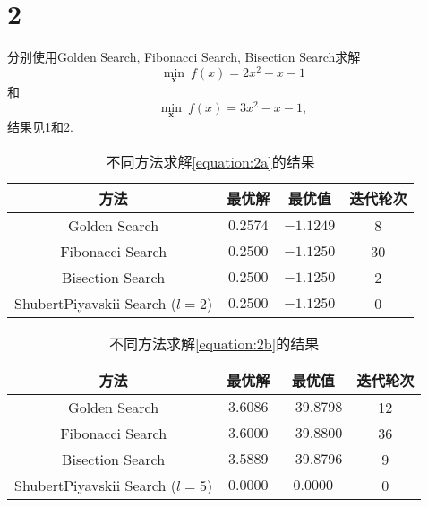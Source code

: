 \section*{2}

分别使用Golden Search, Fibonacci Search, Bisection Search求解
\begin{equation}
    \min_{\bm{x}} ~ f(x)=2x^2-x-1
    \label{equation:2a}
\end{equation}
和
\begin{equation}
    \min_{\bm{x}} ~ f(x)=3x^2-x-1,
    \label{equation:2b}
\end{equation}
结果见\cref{table:2a}和\cref{table:2b}.

\begin{table}[ht]
    \centering
    \caption{不同方法求解\cref{equation:2a}的结果}
    \label{table:2a}
    \begin{tabular}{cccc}
        \toprule
        方法 & 最优解 & 最优值 & 迭代轮次 \\
        \midrule
        Golden Search & $0.2574$ & $-1.1249$ & 8 \\
        Fibonacci Search & $0.2500$ & $-1.1250$ & 30 \\
        Bisection Search & $0.2500$ & $-1.1250$ & 2 \\
        ShubertPiyavskii Search ($l=2$) & $0.2500$ & $-1.1250$ & 0 \\
        \bottomrule
    \end{tabular}
\end{table}


\begin{table}[ht]
    \centering
    \caption{不同方法求解\cref{equation:2b}的结果}
    \label{table:2b}
    \begin{tabular}{cccc}
        \toprule
        方法 & 最优解 & 最优值 & 迭代轮次 \\
        \midrule
        Golden Search & $3.6086$ & $-39.8798$ & 12 \\
        Fibonacci Search & $3.6000$ & $-39.8800$ & 36 \\
        Bisection Search & $3.5889$ & $-39.8796$ & 9 \\
        ShubertPiyavskii Search ($l=5$) & $0.0000$ & $0.0000$ & 0 \\
        \bottomrule
    \end{tabular}
\end{table}
